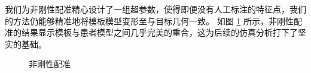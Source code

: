 
我们为非刚性配准精心设计了一组超参数，使得即便没有人工标注的特征点，我们的方法仍能够精准地将模板模型变形至与目标几何一致。
如图 \ref{fig:registration} 所示，非刚性配准的结果显示模板与患者模型之间几乎完美的重合，这为后续的仿真分析打下了坚实的基础。

\begin{figure}
  \centering
  \caption{非刚性配准}
  \label{fig:registration}
\end{figure}

